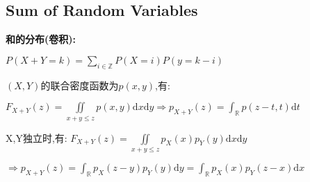 \subsection{Sum of Random Variables}
\textbf{和的分布(卷积):}

$P(X+Y=k) = \sum_{i\in \mathbb{Z}}{P(X=i)P(y=k-i)}$

$(X,Y)$的联合密度函数为$ p(x,y)$,有:

$F_{X+Y}(z) = \iint\limits_{x+y\le z}p(x,y)\mathrm{d}x\mathrm{d}y \Rightarrow p_{X+Y}(z)=\int_{\mathbb{R}}p(z-t,t)\mathrm{d}t$

X,Y独立时,有: $F_{X+Y}(z) = \iint\limits_{x+y\le z}p_X(x)p_Y(y)\mathrm{d}x\mathrm{d}y $

$\Rightarrow p_{X+Y}(z)= \int_{\mathbb{R}}p_X(z-y)p_Y(y)\mathrm{d}y=\int_{\mathbb{R}}{p_X(x)p_Y(z-x)\mathrm{d}x}$

